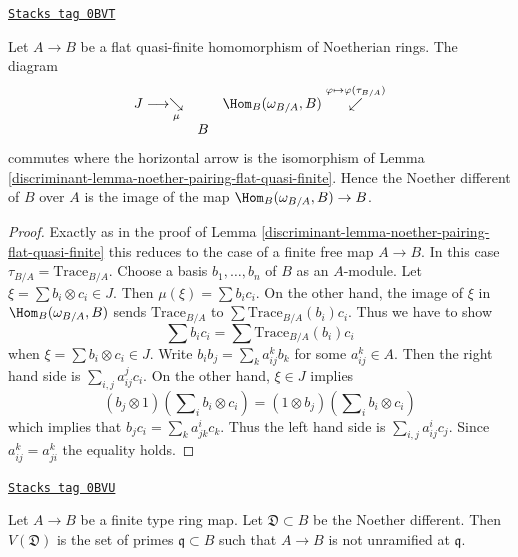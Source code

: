 \begin{lemma}
\label{discriminant-lemma-noether-different-flat-quasi-finite}
\href{https://stacks.math.columbia.edu/tag/0BVT}{\texttt{Stacks tag 0BVT}}

Let $A \to B$ be a flat quasi-finite homomorphism of Noetherian rings.
The diagram
$$
\begin{array}{ccc}J \longrightarrow\underset{\mu}{\searrow} &  & \Hom_B(\omega_{B/A}, B) \overset{\varphi \mapsto \varphi(\tau_{B/A})}{\swarrow} \\  & B & \end{array}
$$
commutes where the horizontal arrow is the isomorphism of
Lemma \ref{discriminant-lemma-noether-pairing-flat-quasi-finite}.
Hence the Noether different of $B$ over $A$
is the image of the map $\Hom_B(\omega_{B/A}, B) \to B$.
\end{lemma}

\begin{proof}

Exactly as in the proof of Lemma \ref{discriminant-lemma-noether-pairing-flat-quasi-finite}
this reduces to the case of a finite free map $A \to B$.
In this case $\tau_{B/A} = \text{Trace}_{B/A}$.
Choose a basis $b_1, \ldots, b_n$ of $B$ as an $A$-module.
Let $\xi = \sum b_i \otimes c_i \in J$. Then $\mu(\xi) = \sum b_i c_i$.
On the other hand, the image of $\xi$ in $\Hom_B(\omega_{B/A}, B)$
sends $\text{Trace}_{B/A}$ to $\sum \text{Trace}_{B/A}(b_i)c_i$.
Thus we have to show
$$
\sum b_ic_i = \sum \text{Trace}_{B/A}(b_i)c_i
$$
when $\xi = \sum b_i \otimes c_i \in J$. Write $b_i b_j = \sum_k a_{ij}^k b_k$
for some $a_{ij}^k \in A$. Then the right hand side is
$\sum_{i, j} a_{ij}^j c_i$. On the other hand, $\xi \in J$ implies
$$
(b_j \otimes 1)(\sum\nolimits_i b_i \otimes c_i) =
(1 \otimes b_j)(\sum\nolimits_i b_i \otimes c_i)
$$
which implies that $b_j c_i = \sum_k a_{jk}^i c_k$. Thus the left hand side
is $\sum_{i, j} a_{ij}^i c_j$. Since $a_{ij}^k = a_{ji}^k$ the equality holds.
\end{proof}

\begin{lemma}
\label{discriminant-lemma-noether-different}
\href{https://stacks.math.columbia.edu/tag/0BVU}{\texttt{Stacks tag 0BVU}}

Let $A \to B$ be a finite type ring map. Let $\mathfrak{D} \subset B$
be the Noether different. Then $V(\mathfrak{D})$ is the set of primes
$\mathfrak q \subset B$ such that $A \to B$ is not unramified at $\mathfrak q$.
\end{lemma}

